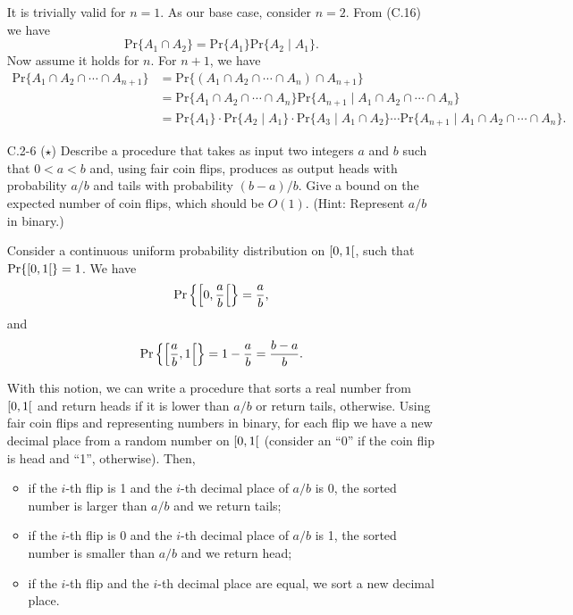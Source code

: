 \begin{enumerate}
\begin{framed}
It is trivially valid for $n = 1$. As our base case, consider $n = 2$. From (C.16) we have
\[
  \text{Pr}\{A_1 \cap A_2\} = \text{Pr}\{A_1\} \text{Pr}\{A_2\;|\;A_1\}.
\]
Now assume it holds for $n$. For $n + 1$, we have
\begin{equation*}
\begin{aligned}
  \text{Pr}\{A_1 \cap A_2 \cap \cdots \cap A_{n + 1}\}
  &= \text{Pr}\{(A_1 \cap A_2 \cap \cdots \cap A_n) \cap A_{n + 1}\}\\
  &= \text{Pr}\{A_1 \cap A_2 \cap \cdots \cap A_n\} \text{Pr}\{A_{n + 1}\;|\;A_1 \cap A_2 \cap \cdots \cap A_n\}\\
  &= \text{Pr}\{A_1\} \cdot \text{Pr}\{A_2\;|\;A_1\} \cdot \text{Pr}\{A_3\;|\;A_1 \cap A_2\} \cdots
     \text{Pr}\{A_{n + 1}\;|\;A_1 \cap A_2 \cap \cdots \cap A_{n}\}.
\end{aligned}
\end{equation*}
\end{framed}

\item[C.2{-}6] {($\star$) Describe a procedure that takes as input two integers
  $a$ and $b$ such that $0 < a < b$ and, using fair coin flips, produces as
  output heads with probability $a/b$ and tails with probability $(b - a)/b$.
  Give a bound on the expected number of coin flips, which should be $O(1)$.
  (Hint: Represent $a/b$ in binary.)}

\begin{framed}
Consider a continuous uniform probability distribution on
$\interval[open right]{0}{1}$, such that $\text{Pr}\{\interval[open right]{0}{1}\} = 1$. We have
\[
  \text{Pr}\left\{\interval[open right, scaled]{0}{\frac{a}{b}}\right\} = \frac{a}{b},
\]
and
\[
  \text{Pr}\left\{\interval[open right, scaled]{\frac{a}{b}}{1}\right\} = 1 - \frac{a}{b} = \frac{b - a}{b}.
\]

With this notion, we can write a procedure that sorts a real number from
$\interval[open right]{0}{1}$ and return heads if it is lower than $a/b$ or
return tails, otherwise. Using fair coin flips and representing numbers in
binary, for each flip we have a new decimal place from a random number on
$\interval[open right]{0}{1}$ (consider an ``0'' if the coin flip is head and
``1'', otherwise). Then,
\begin{itemize}
\item if the $i$-th flip is 1 and the $i$-th decimal place
of $a/b$ is 0, the sorted number is larger than $a/b$ and we return tails;
\item if the $i$-th flip is 0 and the $i$-th decimal place
of $a/b$ is 1, the sorted number is smaller than $a/b$ and we return head;
\item if the $i$-th flip and the $i$-th decimal place are equal, we sort a new
decimal place.
\end{itemize}


\end{framed}
\end{enumerate}
